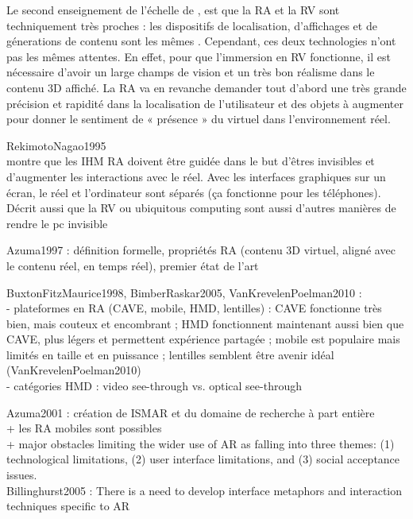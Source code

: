 Le second enseignement de l'échelle de \citeauthor{Milgram1994}, est que la RA et la RV sont techniquement très proches : les dispositifs de localisation, d'affichages et de génerations de contenu sont les mêmes \citep{Billinghurst2015}. Cependant, ces deux technologies n'ont pas les mêmes attentes. En effet, pour que l'immersion en RV fonctionne, il est nécessaire d'avoir un large champs de vision et un très bon réalisme dans le contenu 3D affiché. La RA va en revanche demander tout d'abord une très grande précision et rapidité dans la localisation de l'utilisateur et des objets à augmenter pour donner le sentiment de « présence » du virtuel dans l'environnement réel.


RekimotoNagao1995\\
montre que les IHM RA doivent être guidée dans le but d'êtres invisibles et d'augmenter les interactions avec le réel. Avec les interfaces graphiques sur un écran, le réel et l'ordinateur sont séparés (ça fonctionne pour les téléphones). Décrit aussi que la RV ou ubiquitous computing sont aussi d'autres manières de rendre le pc invisible

Azuma1997 : définition formelle, propriétés RA (contenu 3D virtuel, aligné avec le contenu réel, en temps réel), premier état de l'art

BuxtonFitzMaurice1998, BimberRaskar2005, VanKrevelenPoelman2010 :\\
- plateformes en RA (CAVE, mobile, HMD, lentilles) : CAVE fonctionne très bien, mais couteux et encombrant ; HMD fonctionnent maintenant aussi bien que CAVE, plus légers et permettent expérience partagée ; mobile est populaire mais limités en taille et en puissance ; lentilles semblent être avenir idéal (VanKrevelenPoelman2010)\\
- catégories HMD : video see-through vs. optical see-through


Azuma2001 : création de ISMAR et du domaine de recherche à part entière\\
+ les RA mobiles sont possibles\\
+ major obstacles limiting the wider use of AR as falling into three themes: (1) technological limitations, (2) user interface limitations, and (3) social acceptance issues.\\
Billinghurst2005 : There is a need to develop interface metaphors and interaction techniques specific to AR

